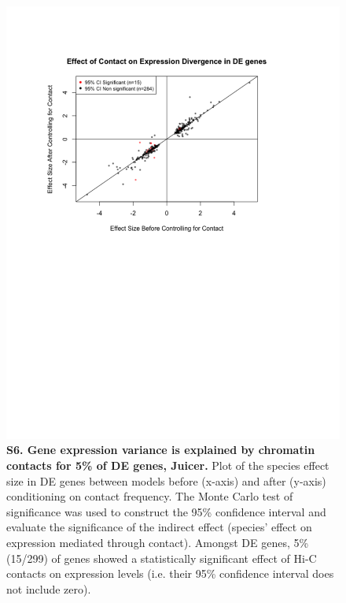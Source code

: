 \begin{figure}[!htb]
\centering
\includegraphics[width=6in]{img/figS6.pdf}
\caption[Gene expression variance is explained by chromatin contacts for 5\% of DE genes, Juicer.]{\textbf{S6. Gene expression variance is explained by chromatin contacts for 5\% of DE genes, Juicer.} Plot of the species effect size in DE genes between models before (x-axis) and after (y-axis) conditioning on contact frequency. The Monte Carlo test of significance was used to construct the 95\% confidence interval and evaluate the significance of the indirect effect (species' effect on expression mediated through contact). Amongst DE genes, 5\% (15/299) of genes showed a statistically significant effect of Hi-C contacts on expression levels (i.e. their 95\% confidence interval does not include zero).}
\label{fig:figS6}
\end{figure}

